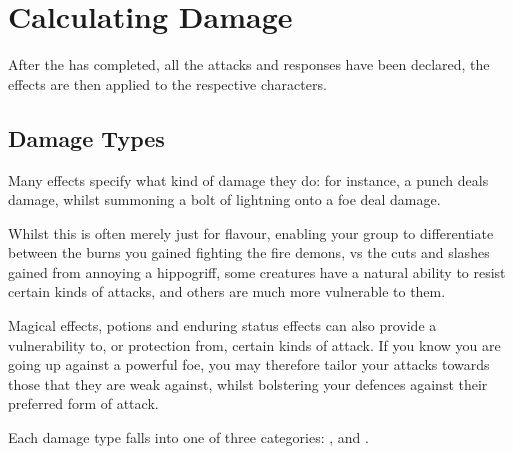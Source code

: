 \chapter{Calculating Damage}


After the  has completed, all the attacks and responses have been declared, the effects are then applied to the respective characters. 




\section{Damage Types}



Many effects specify what kind of damage they do: for instance, a punch deals  damage, whilst summoning a bolt of lightning onto a foe deal  damage. 

Whilst this is often merely just for flavour, enabling your group to differentiate between the burns you gained fighting the fire demons, vs the cuts and slashes gained from annoying a hippogriff, some creatures have a natural ability to resist certain kinds of attacks, and others are much more vulnerable to them. 

Magical effects, potions and enduring status effects can also provide a vulnerability to, or protection from, certain kinds of attack. If you know you are going up against a powerful foe, you may therefore tailor your attacks towards those that they are weak against, whilst bolstering your defences against their preferred form of attack. 

Each damage type falls into one of three categories: ,  and .


\newcommand\damCat[3]
{
	\subsection{#1}
	
	#2
	
	\begin{itemize}
	#3
	\end{itemize}
}
\newcommand\damage[2]
{

\keyItem{#1}{#2}
}


